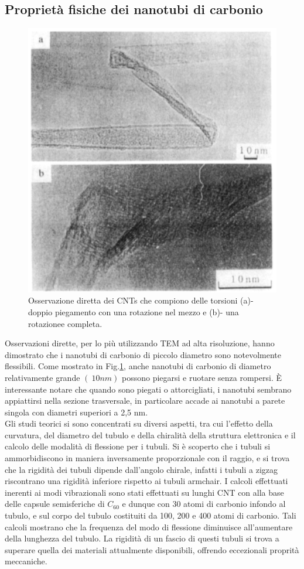 \documentclass[a4paper,titlepage]{book}
\begin{document}
\subsection{Proprietà fisiche dei nanotubi di carbonio}
\begin{figure}[h!] 
	\centering
	\includegraphics[width=0.55\columnwidth]{physicalcnt.png}
	\caption{ 	\label{CNT}
		Osservazione diretta dei CNTs che compiono delle torsioni (a)- doppio piegamento con una rotazione nel mezzo e (b)- una rotazionee completa. 
	}
\end{figure}
Osservazioni dirette, per lo più utilizzando TEM ad alta risoluzione, hanno dimostrato che i nanotubi di carbonio di piccolo diametro sono notevolmente flessibili. Come mostrato in Fig.\ref{CNT}, anche nanotubi di carbonio di diametro relativamente grande $(~ 10 nm)$ possono piegarsi e ruotare senza rompersi. È interessante notare che quando sono piegati o attorcigliati, i nanotubi sembrano appiattirsi nella sezione trasversale, in particolare accade ai nanotubi a parete singola con diametri superiori a 2,5 nm.\\
Gli studi teorici si sono concentrati su diversi aspetti, tra cui l'effetto della curvatura, del diametro del tubulo e della chiralità della struttura elettronica e il calcolo delle modalità di flessione per i tubuli.
Si è scoperto che i tubuli si ammorbidiscono in maniera inversamente proporzionale con il raggio, e si trova che la rigidità dei tubuli dipende dall'angolo chirale, infatti i tubuli a zigzag riscontrano una rigidità inferiore rispetto ai tubuli armchair.
I calcoli effettuati inerenti ai modi vibrazionali sono stati effettuati su lunghi CNT con alla base delle capsule semisferiche di $C_{60}$ e dunque con 30 atomi di carbonio infondo al tubulo, e sul corpo del tubulo costituiti da 100, 200 e 400 atomi di carbonio. Tali calcoli mostrano che la frequenza del modo di flessione diminuisce all'aumentare della lunghezza del tubulo. La rigidità di un fascio di questi tubuli si trova a superare quella dei materiali attualmente disponibili, offrendo eccezionali proprità meccaniche.\\
\end{document}
